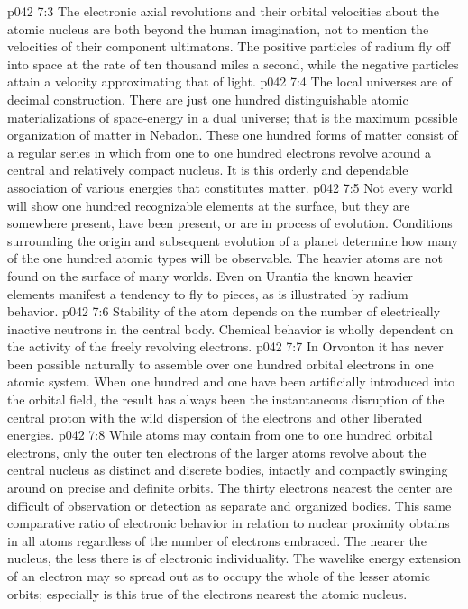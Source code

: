\vs p042 7:3 The electronic axial revolutions and their orbital velocities about the atomic nucleus are both beyond the human imagination, not to mention the velocities of their component ultimatons. The positive particles of radium fly off into space at the rate of ten thousand miles a second, while the negative particles attain a velocity approximating that of light.
\vs p042 7:4 \pc The local universes are of decimal construction. There are just one hundred distinguishable atomic materializations of space\hyp{}energy in a dual universe; that is the maximum possible organization of matter in Nebadon. These one hundred forms of matter consist of a regular series in which from one to one hundred electrons revolve around a central and relatively compact nucleus. It is this orderly and dependable association of various energies that constitutes matter.
\vs p042 7:5 Not every world will show one hundred recognizable elements at the surface, but they are somewhere present, have been present, or are in process of evolution. Conditions surrounding the origin and subsequent evolution of a planet determine how many of the one hundred atomic types will be observable. The heavier atoms are not found on the surface of many worlds. Even on Urantia the known heavier elements manifest a tendency to fly to pieces, as is illustrated by radium behavior.
\vs p042 7:6 Stability of the atom depends on the number of electrically inactive neutrons in the central body. Chemical behavior is wholly dependent on the activity of the freely revolving electrons.
\vs p042 7:7 \pc In Orvonton it has never been possible naturally to assemble over one hundred orbital electrons in one atomic system. When one hundred and one have been artificially introduced into the orbital field, the result has always been the instantaneous disruption of the central proton with the wild dispersion of the electrons and other liberated energies.
\vs p042 7:8 \pc While atoms may contain from one to one hundred orbital electrons, only the outer ten electrons of the larger atoms revolve about the central nucleus as distinct and discrete bodies, intactly and compactly swinging around on precise and definite orbits. The thirty electrons nearest the center are difficult of observation or detection as separate and organized bodies. This same comparative ratio of electronic behavior in relation to nuclear proximity obtains in all atoms regardless of the number of electrons embraced. The nearer the nucleus, the less there is of electronic individuality. The wavelike energy extension of an electron may so spread out as to occupy the whole of the lesser atomic orbits; especially is this true of the electrons nearest the atomic nucleus.

